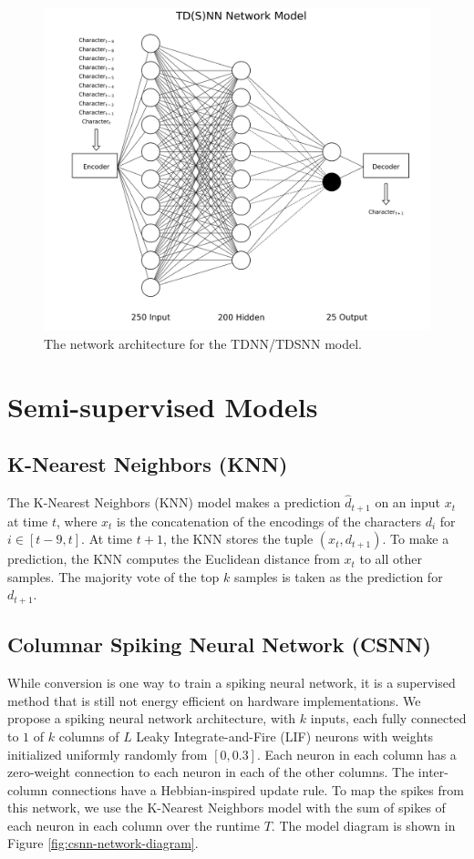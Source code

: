 \documentclass{article}
\begin{document}
\begin{figure}[H]
    \centering
    \includegraphics[width=0.9\linewidth]{../diagrams/tdnn.png}
    \caption{The network architecture for the TDNN/TDSNN model.}
    \label{fig:lstm-online-model}
\end{figure}

\section*{Semi-supervised Models}

\subsection*{K-Nearest Neighbors (KNN)}

The K-Nearest Neighbors (KNN) model makes a prediction $\hat{d}_{t+1}$ on an input $x_t$ at time $t$, where $x_t$ is the concatenation of the encodings of the characters $d_i$ for $i \in [t-9, t]$. At time $t+1$, the KNN stores the tuple $(x_t, d_{t+1})$. To make a prediction, the KNN computes the Euclidean distance from $x_t$ to all other samples. The majority vote of the top $k$ samples is taken as the prediction for $d_{t+1}$.

\subsection*{Columnar Spiking Neural Network (CSNN)}

While conversion is one way to train a spiking neural network, it is a supervised method that is still not energy efficient on hardware implementations. We propose a spiking neural network architecture, with $k$ inputs, each fully connected to $1$ of $k$ columns of $L$ Leaky Integrate-and-Fire (LIF) neurons with weights initialized uniformly randomly from $\left[0, 0.3\right]$. \cite{gerstner2002spiking} Each neuron in each column has a zero-weight connection to each neuron in each of the other columns. The inter-column connections have a Hebbian-inspired update rule. To map the spikes from this network, we use the K-Nearest Neighbors model with the sum of spikes of each neuron in each column over the runtime $T$. \cite{beliaev2007time} The model diagram is shown in Figure \ref{fig:csnn-network-diagram}.
\end{document}
